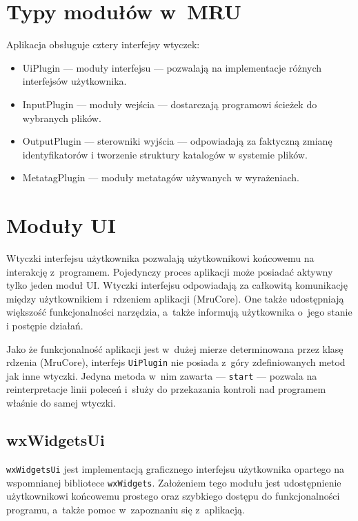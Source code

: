 \section{Typy modułów w~MRU}
\label{moduly}
Aplikacja obsługuje cztery interfejsy wtyczek:
\begin{itemize}
\item UiPlugin --- moduły interfejsu --- pozwalają na implementacje różnych interfejsów użytkownika.
\item InputPlugin --- moduły wejścia --- dostarczają programowi ścieżek do wybranych plików.
\item OutputPlugin --- sterowniki wyjścia --- odpowiadają za faktyczną zmianę identyfikatorów i tworzenie struktury katalogów w systemie plików.
\item MetatagPlugin --- moduły metatagów używanych w wyrażeniach.
\end{itemize}

\section{Moduły UI}
\par
Wtyczki interfejsu użytkownika pozwalają użytkownikowi końcowemu na interakcję z~programem.
Pojedynczy proces aplikacji może posiadać aktywny tylko jeden moduł UI. 
Wtyczki interfejsu odpowiadają za całkowitą komunikację między użytkownikiem i~rdzeniem aplikacji (MruCore). One także udostępniają większość funkcjonalności narzędzia, a~także informują użytkownika o~jego stanie i postępie działań.
\par
Jako że funkcjonalność aplikacji jest w~dużej mierze determinowana przez klasę rdzenia (MruCore), interfejs \texttt{UiPlugin} nie posiada z~góry zdefiniowanych metod jak inne wtyczki. Jedyna metoda w~nim zawarta --- \texttt{start} --- pozwala na reinterpretacje linii poleceń i~służy do przekazania kontroli nad programem właśnie do samej wtyczki.

\subsection{wxWidgetsUi}
\par
\texttt{wxWidgetsUi} jest implementacją graficznego interfejsu użytkownika opartego na wspomnianej bibliotece \texttt{wxWidgets}. Założeniem tego modułu jest udostępnienie użytkownikowi końcowemu prostego oraz szybkiego dostępu do funkcjonalności programu, a~także pomoc w~zapoznaniu się z~aplikacją.

